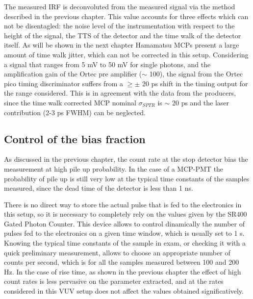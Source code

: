 The measured IRF is deconvoluted from the measured signal via the method described in the previous chapter.
This value accounts for three effects which can not be disentagled: the noise level of the instrumentation with respect to the height of the signal, the TTS of the detector and the time walk of the detector itself.
As will be shown in the next chapter Hamamatsu MCPs present a large amount of time walk jitter, which can not be corrected in this setup. Considering a signal that ranges from 5 mV to 50 mV for single photons, and the amplification gain of the Ortec pre amplifier ($\sim$ 100), the signal from the Ortec pico timing discriminator suffers from a $\geq\pm$ 20 ps shift in the timing output for the range considered.
This is in agreement with the data from the producers, since the time walk corrected MCP nominal $\sigma _{SPTR}$ is $\sim$ 20 ps and the laser contribution (2-3 ps FWHM) can be neglected.

\subsection{Control of the bias fraction}

As discussed in the previous chapter, the count rate at the stop detector bias the measurement at high pile up probability. In the case of a MCP-PMT the probability of pile up is still very low at the typical time constants of the samples measured, since the dead time of the detector is less than 1 ns. 

There is no direct way to store the actual pulse that is fed to the electronics in this setup, so it is necessary to completely rely on the values given by the SR400 Gated Photon Counter. 
This device allows to control dinamically the number of pulses fed to the electronics on a given time window, which is usually set to 1 s. Knowing the typical time constants of the sample in exam, or checking it with a quick preliminary measurement, allows to choose an appropriate number of counts per second, which is for all the samples measured between 100 and 200 Hz.
In the case of rise time, as shown in the previous chapter the effect of high count rates is less pervasive on the parameter extracted, and at the rates considered in this VUV setup does not affect the values obtained significatively.


